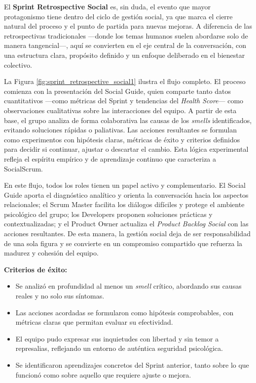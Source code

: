 El \textbf{Sprint Retrospective Social} es, sin duda, el evento que mayor protagonismo tiene dentro del ciclo de gestión social, ya que marca el cierre natural del proceso y el punto de partida para nuevas mejoras. A diferencia de las retrospectivas tradicionales —donde los temas humanos suelen abordarse solo de manera tangencial—, aquí se convierten en el eje central de la conversación, con una estructura clara, propósito definido y un enfoque deliberado en el bienestar colectivo.

La Figura \ref{fig:sprint_retrospective_social1} ilustra el flujo completo. El proceso comienza con la presentación del Social Guide, quien comparte tanto datos cuantitativos —como métricas del Sprint y tendencias del \textit{Health Score}— como observaciones cualitativas sobre las interacciones del equipo. A partir de esta base, el grupo analiza de forma colaborativa las causas de los \textit{smells} identificados, evitando soluciones rápidas o paliativas.
Las acciones resultantes se formulan como experimentos con hipótesis claras, métricas de éxito y criterios definidos para decidir si continuar, ajustar o descartar el cambio. Esta lógica experimental refleja el espíritu empírico y de aprendizaje continuo que caracteriza a SocialScrum.

En este flujo, todos los roles tienen un papel activo y complementario. El Social Guide aporta el diagnóstico analítico y orienta la conversación hacia los aspectos relacionales; el Scrum Master facilita los diálogos difíciles y protege el ambiente psicológico del grupo; los Developers proponen soluciones prácticas y contextualizadas; y el Product Owner actualiza el \textit{Product Backlog Social} con las acciones resultantes.
De esta manera, la gestión social deja de ser responsabilidad de una sola figura y se convierte en un compromiso compartido que refuerza la madurez y cohesión del equipo.

\vspace{1em}

\textbf{Criterios de éxito:}
\begin{itemize}
    \item Se analizó en profundidad al menos un \textit{smell} crítico, abordando sus causas reales y no solo sus síntomas.
    \item Las acciones acordadas se formularon como hipótesis comprobables, con métricas claras que permitan evaluar su efectividad.
    \item El equipo pudo expresar sus inquietudes con libertad y sin temor a represalias, reflejando un entorno de auténtica seguridad psicológica.
    \item Se identificaron aprendizajes concretos del Sprint anterior, tanto sobre lo que funcionó como sobre aquello que requiere ajuste o mejora.
\end{itemize}

